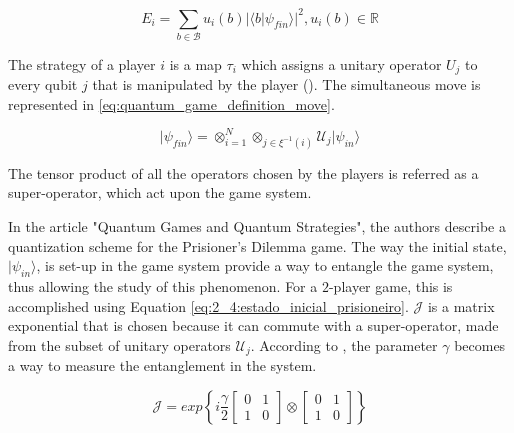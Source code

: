 \begin{equation}
E_{i}=\sum_{b \in \mathcal{B}} u_{i}(b)\vert \langle b\vert \psi_{fin}\rangle\vert^{2}, u_{i}(b) \in \mathbb{R}
\label{eq:quantum_game_definition_payoff_func}
\end{equation}

The strategy of a player $i$ is a map $\tau_{i}$ which assigns a
unitary operator $U_{j}$ to every qubit $j$ that is manipulated
by the player ().
The simultaneous move is represented in \ref{eq:quantum_game_definition_move}.

\begin{equation}
\vert\psi_{fin}\rangle=\otimes_{i=1}^{N}\otimes_{j\in\xi^{-1}(i)}\mathcal{U}_{j}\vert\psi_{in}\rangle
\label{eq:quantum_game_definition_move}
\end{equation}

The tensor product of all the operators chosen by the players is referred as a super-operator, which act upon the game system.

In the article "Quantum Games and Quantum Strategies"\cite{Eisert2008}, the authors describe a quantization scheme for the Prisioner's Dilemma game. The way the initial state, $\vert\psi_{in}\rangle$, is set-up in the game system provide a way to entangle the game system, thus allowing the study of this phenomenon. For a $2$-player game, this is accomplished using Equation \ref{eq:2_4:estado_inicial_prisioneiro}. $\mathcal{J}$ is a matrix exponential that is chosen because it can commute with a super-operator, made from the subset of unitary operators $\mathcal{U}_{j}$\cite{citeulike:10961388}. According to \cite{Eisert2008}, the parameter $\gamma$ becomes a way to measure the entanglement in the system.

\begin{equation}
\label{eq:2_4:matrix_exponencial_esoterica}
\mathcal{J}=exp\left\{ i\frac{\gamma}{2}\left[\begin{array}{cc}
0 & 1\\
1 & 0
\end{array}\right]\otimes\left[\begin{array}{cc}
0 & 1\\
1 & 0
\end{array}\right]\right\}
\end{equation} 

